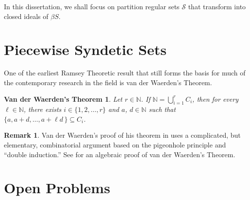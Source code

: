 \documentclass[12pt]{article}
\theoremstyle{plain}
\newtheorem{vdw}[thm]{Van der Waerden's Theorem}
\theoremstyle{definition}
\newtheorem{rmk}[thm]{Remark}
\newcommand{\bbN}{\mathbb{N}}
\newcommand{\calS}{\mathcal{S}}
\begin{document}
In this dissertation, we shall focus on partition regular sets $\calS$ that transform into closed ideals of $\beta S$. 

\section{Piecewise Syndetic Sets}
One of the earliest Ramsey Theoretic result that still forms the basis for much of the contemporary research in the field is van der Waerden's Theorem.

\begin{vdw}
  Let $r \in \bbN$. 
  If $\bbN = \bigcup_{i=1}^r C_i$, then for every $\ell \in \bbN$, there exists $i \in \{1, 2, \ldots, r\}$ and $a$, $d \in \bbN$ such that $\{a, a+d, \ldots, a+\ell d \,\} \subseteq C_i$.
\end{vdw}
\begin{rmk}
  Van der Waerden's proof of his theorem in \cite{Van-der-Waerden:1927fk} uses a complicated, but elementary, combinatorial argument based on the pigeonhole principle and ``double induction.''
  See \cite[Theorem 14.1 and Corollary 14.2]{Hindman:1998fk} for an algebraic proof of van der Waerden's Theorem.
\end{rmk}

\section*{Open Problems}

\theendnotes



\end{document}
